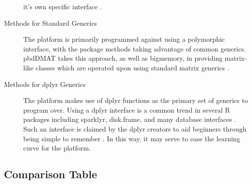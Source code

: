 \begin{description}
    it's own specific interface \cite{microsoft20}.
  \item[Methods for Standard Generics]
    The platform is primarily programmed against using a polymorphic
    interface, with the package methods taking advantage of common generics.
    pbdDMAT takes this approach, as well as bigmemory, in providing
    matrix-like classes which are operated upon using standard matrix
    generics \cite{pbdDMATpackage}\cite{kane13:bigmemory}.
  \item[Methods for dplyr Generics]
    The platform makes use of dplyr functions as the primary set of generics
    to program over. Using a dplyr interface is a common trend in several R
    packages including sparklyr, disk.frame, and many database interfaces
    \cite{luraschi20}\cite{zj20}. Such an interface is claimed by the dplyr
    creators to aid beginners through being simple to remember
    \cite{wickham2019welcome}. In this way, it may serve to ease the
    learning curve for the platform.
\end{description}

\hypertarget{sec:comp-tab}{%
  \subsection{Comparison Table}\label{sec:comp-tab}}

